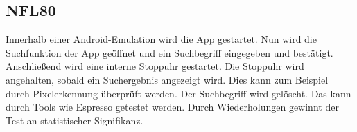 \subsection*{NFL80}

Innerhalb einer Android-Emulation wird die App gestartet.
Nun wird die Suchfunktion der App geöffnet und ein Suchbegriff eingegeben und bestätigt.
Anschließend wird eine interne Stoppuhr gestartet.
Die Stoppuhr wird angehalten, sobald ein Suchergebnis angezeigt wird.
Dies kann zum Beispiel durch Pixelerkennung überprüft werden.
Der Suchbegriff wird gelöscht.
Das kann durch Tools wie Espresso getestet werden.
Durch Wiederholungen gewinnt der Test an statistischer Signifikanz.